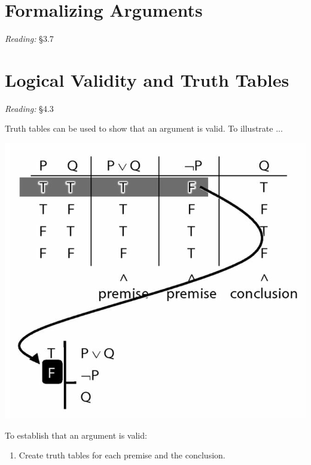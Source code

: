 \documentclass[12pt]{extarticle}
\begin{document}
\begin{multicols*}{3}
 
\section{Formalizing Arguments}
 
\emph{Reading:} §3.7
 
 
 
\section{Logical Validity and Truth Tables}
 
\emph{Reading:} §4.3
 
\begin{minipage}{\columnwidth}
 
Truth tables can be used to show that an argument is valid. To illustrate ...
 
\begin{center}
\includegraphics[scale=0.3]{img/unit_14_example.png}
\end{center}
\end{minipage}
 
\begin{minipage}{\columnwidth}
 
To establish that an argument is valid:
 
\begin{enumerate}
 
\item Create truth tables for each premise and the conclusion.
 

\end{enumerate}
\end{minipage}
\end{multicols*}
\end{document}
